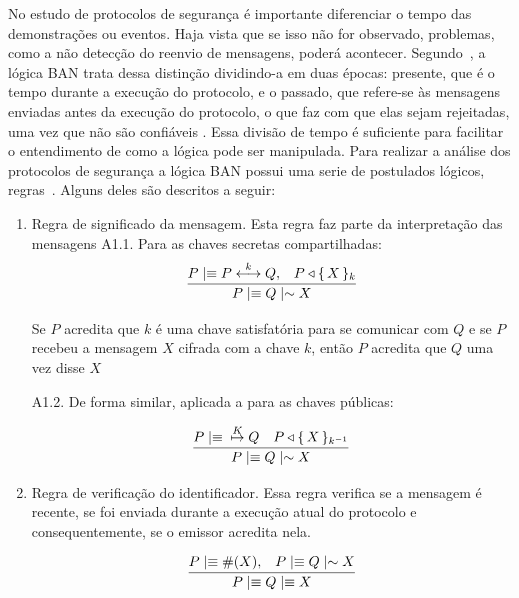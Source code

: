 No estudo de protocolos de segurança é importante diferenciar o tempo das demonstrações ou eventos.  Haja vista que se isso não for observado, problemas, como a não detecção  do  reenvio de mensagens,  poderá acontecer.  Segundo~\cite{Burrows1990}, a lógica BAN trata dessa distinção dividindo-a em duas épocas: presente, que é o tempo durante a execução do protocolo, e o passado,  que refere-se às mensagens enviadas antes da execução do protocolo, o que faz com que elas sejam rejeitadas, uma vez que não são confiáveis .  Essa divisão de tempo é suficiente para facilitar o entendimento de como a lógica pode ser manipulada.
Para realizar a análise dos protocolos de segurança a lógica BAN possui uma serie de postulados lógicos, regras~\cite{Burrows1990}. Alguns deles  são descritos  a seguir:

\begin{enumerate}[ A )]

 \item Regra de significado da mensagem. Esta regra faz parte da interpretação das mensagens
    A1.1. Para as chaves secretas compartilhadas:
    \begin{displaymath}
        \infer
        {{P}\mid\equiv{{Q}\mid\sim{X}}}
        {{P}\mid\equiv{\Share{P}{k}{Q,}}& {P}\triangleleft{\Encrypt{X}{k}}}
    \end{displaymath}

    Se $P$ acredita que $k$ é uma chave satisfatória para se comunicar com $Q$ e se $P$ recebeu a mensagem $X$ cifrada com a chave $k$, então $P$ acredita que $Q$ uma vez disse $X$

    A1.2. De forma similar, aplicada a para as chaves públicas:

    \begin{displaymath}
        \infer
        {{P}\mid\equiv{{Q}\mid\sim{X}}}
        {{P}\mid\equiv{\PubKey{K}{Q}}& {P}\triangleleft{\Encrypt{X}{k ^{-1}}}}
    \end{displaymath}



\item Regra de verificação do identificador. Essa regra verifica se a mensagem é recente, se foi enviada durante a execução atual do protocolo e consequentemente, se o emissor acredita nela.

  \begin{displaymath}
    \infer
    {{P}\mid\equiv{{Q}\mid\equiv{X}}}
    {{P}\mid\equiv{\#(X),}& {P}\mid\equiv{{Q}\mid\sim{X}}}
  \end{displaymath}


\end{enumerate}
